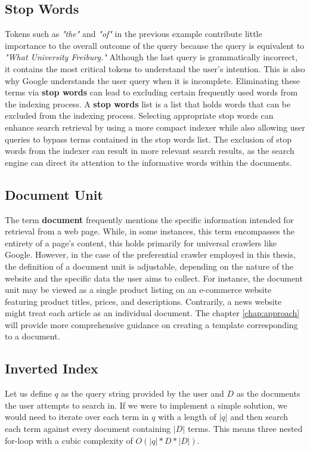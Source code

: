 \subsection*{Stop Words}
Tokens such as \textit{"the"} and \textit{"of"} in the previous example contribute little importance to the overall outcome of the query because the query is equivalent to \textit{"What University Freiburg."} Although the last query is grammatically incorrect, it contains the most critical tokens to understand the user's intention. This is also why Google understands the user query when it is incomplete.  Eliminating these terms via \textbf{stop words} can lead to excluding certain frequently used words from the indexing process. A \textbf{stop words} list is a list that holds words that can be excluded from the indexing process. Selecting appropriate stop words can enhance search retrieval by using a more compact indexer while also allowing user queries to bypass terms contained in the stop words list. The exclusion of stop words from the indexer can result in more relevant search results, as the search engine can direct its attention to the informative words within the documents.
\subsection{Document Unit}
The term \textbf{document} frequently mentions the specific information intended for retrieval from a web page. While, in some instances, this term encompasses the entirety of a page's content, this holds primarily for universal crawlers like Google. However, in the case of the preferential crawler employed in this thesis, the definition of a document unit is adjustable, depending on the nature of the website and the specific data the user aims to collect. For instance, the document unit may be viewed as a single product listing on an e-commerce website featuring product titles, prices, and descriptions. Contrarily, a news website might treat each article as an individual document. The chapter \ref{chap:approach} will provide more comprehensive guidance on creating a template corresponding to a document.

\subsection{Inverted Index}\label{sec:inverted-index}
Let us define $q$ as the query string provided by the user and $D$ as the documents the user attempts to search in. If we were to implement a simple solution, we would need to iterate over each term in $q$ with a length of $|q|$ and then search each term against every document containing $|D|$ terms. This means three nested for-loop with a cubic complexity of $O(|q| * D * |D|)$.

